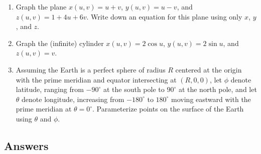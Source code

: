 \begin{enumerate}
\begin{enumerate}
\item Graph the plane $x(u,v) = u + v$, $y(u,v) = u - v$, and $z(u,v) = 1 + 4u + 6v$. Write down an equation for this plane using only $x$, $y$, and $z$.
\item Graph the (infinite) cylinder $x(u,v) = 2\cos u$, $y(u,v) = 2\sin u$, and $z(u,v) = v$.
\item Assuming the Earth is a perfect sphere of radius $R$ centered at the origin with the prime meridian and equator intersecting at $(R,0,0)$, let $\phi$ denote latitude, ranging from $-90^{\circ}$ at the south pole to $90^{\circ}$ at the north pole, and let $\theta$ denote longitude, increasing from $-180^{\circ}$ to $180^{\circ}$ moving eastward with the prime meridian at $\theta = 0^{\circ}$. Parameterize points on the surface of the Earth using $\theta$ and $\phi$.
\end{enumerate}
\end{enumerate}


\newpage
\subsection{Answers}

